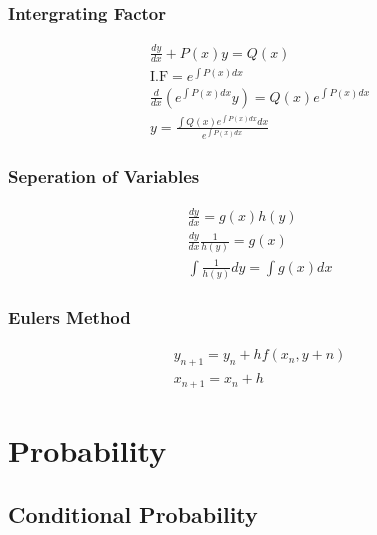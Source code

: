 \documentclass{article}
\begin{document}
        \subsubsection{Intergrating Factor}
        \begin{equation}
        \begin{split}
            \frac {dy} {dx} + P(x)y = Q(x) \\
            \textrm{I.F} = e^{\int P(x) dx} \\
            \frac d {dx} (e^{\int P(x) dx}y) = Q(x)e^{\int P(x) dx} \\
            y = \frac {\int Q(x)e^{\int P(x) dx}dx} {e^{\int P(x) dx}}
        \end{split}
        \end{equation}

        \subsubsection{Seperation of Variables}
        \begin{equation}
        \begin{split}
            \frac {dy} {dx} = g(x)h(y) \\
            \frac {dy} {dx} \frac 1 {h(y)} = g(x) \\
            \int \frac 1 {h(y)} dy = \int g(x) dx
        \end{split}
        \end{equation}

        \subsubsection{Eulers Method}
        \begin{equation}
            \begin{split}
            y_{n+1} = y_n + hf(x_n, y+n) \\
            x_{n+1} = x_n + h
        \end{split}
        \end{equation}
        

    \section{Probability}

    \subsection{Conditional Probability}
\end{document}
